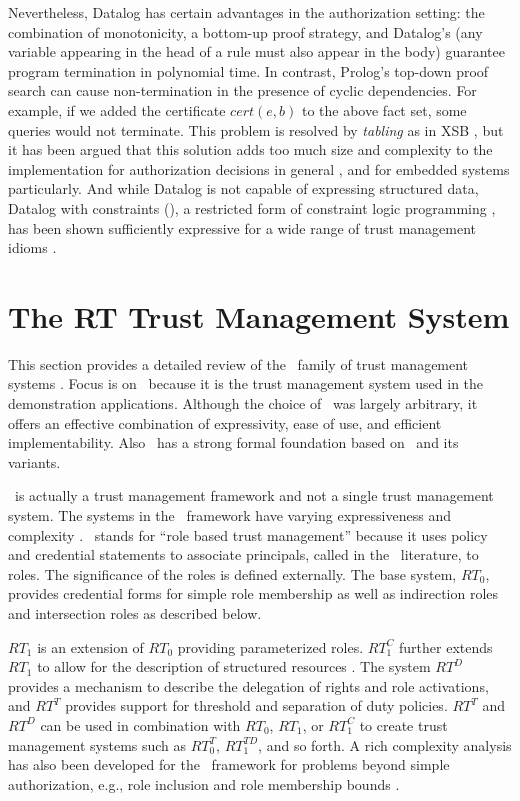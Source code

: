 Nevertheless, Datalog has certain advantages in the authorization setting: the combination of
monotonicity, a bottom-up proof strategy, and Datalog's  (any variable
appearing in the head of a rule must also appear in the body) guarantee program termination in
polynomial time. In contrast, Prolog's top-down proof search can cause non-termination in the
presence of cyclic dependencies. For example, if we added the certificate $\mathit{cert}(e,b)$
to the above fact set, some queries would not terminate. This problem is resolved by
\emph{tabling} as in XSB \cite{xsb-page}, but it has been argued that this solution adds too
much size and complexity to the implementation for authorization decisions in general
\cite{Li:DRBTMF}, and for embedded systems particularly. And while Datalog is not capable of
expressing structured data, Datalog with constraints (\datalogc), a restricted form of
constraint logic programming \cite{jaffar-maher-jlp94}, has been shown sufficiently expressive
for a wide range of trust management idioms \cite{Li:DCFTML}.

\section{The RT Trust Management System}
\label{section-rt}

This section provides a detailed review of the \RT\ family of trust management systems
\cite{Li:DRBTMF}. Focus is on \RT\ because it is the trust management system used in the
demonstration applications. Although the choice of \RT\ was largely arbitrary, it offers
an effective combination of expressivity, ease of use, and efficient implementability. Also
\RT\ has a strong formal foundation based on \datalog\ and its variants.

\RT\ is actually a trust management framework and not a single trust management system. The
systems in the \RT\ framework have varying expressiveness and complexity
\cite{Li:DRBTMF,Li:DCDTM,Li:RRBTMF}. \RT\ stands for ``role based trust management'' because it
uses policy and credential statements to associate principals, called  in the
\RT\ literature, to roles. The significance of the roles is defined externally. The base
system, $RT_0$, provides credential forms for simple role membership as well as indirection
roles and intersection roles as described below.

$RT_1$ is an extension of $RT_0$ providing parameterized roles. $RT_1^C$ further extends $RT_1$
to allow for the description of structured resources \cite{Li:DCFTML,Li:RRBTMF}. The system
$RT^D$ provides a mechanism to describe the delegation of rights and role activations, and
$RT^T$ provides support for threshold and separation of duty policies. $RT^T$ and $RT^D$ can be
used in combination with $RT_0$, $RT_1$, or $RT_1^C$ to create trust management systems such as
$RT_0^T$, $RT_1^{TD}$, and so forth. A rich complexity analysis has also been developed for the
\RT\ framework for problems beyond simple authorization, e.g., role inclusion and role
membership bounds \cite{Li:BPOCSATM}.

